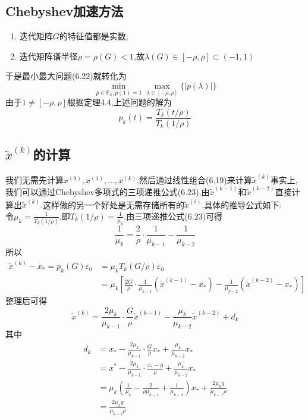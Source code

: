 \documentclass[12pt,a4paper]{article}
\begin{document}
\subsection*{Chebyshev加速方法}
\begin{enumerate}[(1)]
\item 迭代矩阵$G$的特征值都是实数;
\item 迭代矩阵谱半径$\rho=\rho(G)<1$,故$\lambda(G) \in[-\rho, \rho] \subset(-1,1)$
\end{enumerate}
于是最小最大问题(6.22)就转化为
$$
\min _{p \in \mathbb{P}_{k}, p(1)=1} \max _{\lambda \in[-\rho, \rho]}\{|p(\lambda)|\}
$$
由于$1 \neq[-\rho, \rho]$根据定理4.4,上述问题的解为
$$
p_{k}(t)=\frac{T_{k}(t / \rho)}{T_{k}(1 / \rho)}
$$
\subsection*{$\tilde{x}^{(k)}$的计算}
我们无需先计算$x^{(0)}, x^{(1)}, \ldots, x^{(k)}$,然后通过线性组合(6.19)来计算$\tilde{x}^{(k)}$事实上,我们可以通过Chebyshev多项式的三项递推公式(6.23),由$\tilde{x}^{(k-1)}$和$\tilde{x}^{(k-2)}$直接计算出$\tilde{x}^{(k)}$.这样做的另一个好处是无需存储所有的$\tilde{x}^{(i)}$.具体的推导公式如下:\\
令$\mu_{k}=\frac{1}{T_{k}(1 / \rho)}$,即$T_{k}(1 / \rho)=\frac{1}{\mu_{k}}$.由三项递推公式(6.23)可得
$$
\frac{1}{\mu_{k}}=\frac{2}{\rho} \cdot \frac{1}{\mu_{k-1}}-\frac{1}{\mu_{k-2}}
$$
所以
$$
\begin{aligned} \tilde{x}^{(k)}-x_{*}=p_{k}(G) \varepsilon_{0} &=\mu_{k} T_{k}(G / \rho) \varepsilon_{0} \\ &=\mu_{k}\left[\frac{2 G}{\rho} \cdot \frac{1}{\mu_{k-1}}\left(\tilde{x}^{(k-1)}-x_{*}\right)-\frac{1}{\mu_{k-2}}\left(\tilde{x}^{(k-2)}-x_{*}\right)\right] \end{aligned}
$$
整理后可得
$$
\boxed{\tilde{x}^{(k)}=\frac{2 \mu_{k}}{\mu_{k-1}} \cdot \frac{G}{\rho} \tilde{x}^{(k-1)}-\frac{\mu_{k}}{\mu_{k-2}} \tilde{x}^{(k-2)}+d_{k}}
$$
其中
$$
\begin{aligned} d_{k} &=x_{*}-\frac{2 \mu_{k}}{\mu_{k-1}} \cdot \frac{G}{\rho} x_{*}+\frac{\mu_{k}}{\mu_{k-2}} x_{*} \\ &=x^{*}-\frac{2 \mu_{k}}{\mu_{k-1}} \cdot \frac{x_{*}-g}{\rho}+\frac{\mu_{k}}{\mu_{k-2}} x_{*} \\ &=\mu_{k}\left(\frac{1}{\mu_{k}}-\frac{2}{\rho \mu_{k-1}}+\frac{1}{\mu_{k-2}}\right) x_{*}+\frac{2 \mu_{k} g}{\mu_{k-1} \rho} \\ &=\frac{2 \mu_{k} g}{\mu_{k-1} \rho} \end{aligned}
$$
\end{document}
